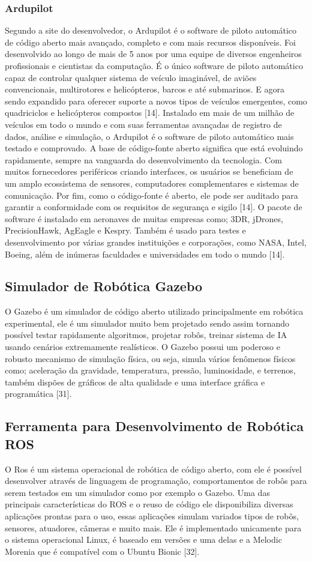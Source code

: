\subsubsection{Ardupilot}
Segundo a site do desenvolvedor, o Ardupilot é o software de piloto automático de código aberto mais avançado, completo e com mais recursos disponíveis. Foi desenvolvido ao longo de mais de 5 anos por uma equipe de diversos engenheiros profissionais e cientistas da computação. É o único software de piloto automático capaz de controlar qualquer sistema de veículo imaginável, de aviões convencionais, multirotores e helicópteros, barcos e até submarinos. E agora sendo expandido para oferecer suporte a novos tipos de veículos emergentes, como quadriciclos e helicópteros compostos [14].
Instalado em mais de um milhão de veículos em todo o mundo e com suas ferramentas avançadas de registro de dados, análise e simulação, o Ardupilot é o software de piloto automático mais testado e comprovado. A base de código-fonte aberto significa que está evoluindo rapidamente, sempre na vanguarda do desenvolvimento da tecnologia. Com muitos fornecedores periféricos criando interfaces, os usuários se beneficiam de um amplo ecossistema de sensores, computadores complementares e sistemas de comunicação. Por fim, como o código-fonte é aberto, ele pode ser auditado para garantir a conformidade com os requisitos de segurança e sigilo [14].
O pacote de software é instalado em aeronaves de muitas empresas como; 3DR, jDrones, PrecisionHawk, AgEagle e Kespry. Também é usado para testes e desenvolvimento por várias grandes instituições e corporações, como NASA, Intel, Boeing, além de inúmeras faculdades e universidades em todo o mundo [14].

\subsection{Simulador de Robótica Gazebo}
O Gazebo é um simulador de código aberto utilizado principalmente em robótica experimental, ele é um simulador muito bem projetado sendo assim tornando possível testar rapidamente algoritmos, projetar robôs, treinar sistema de IA usando cenários extremamente realísticos. O Gazebo possui um poderoso e robusto mecanismo de simulação física, ou seja, simula vários fenômenos físicos como; aceleração da gravidade, temperatura, pressão, luminosidade, e terrenos, também dispões de gráficos de alta qualidade e uma interface gráfica e programática [31]. 
\subsection{Ferramenta para Desenvolvimento de Robótica ROS}
O Ros é um sistema operacional de robótica de código aberto, com ele é possível desenvolver através de linguagem de programação, comportamentos de robôs para serem testados em um simulador como por exemplo o Gazebo. Uma das principais características do ROS e o reuso de código ele disponibiliza diversas aplicações prontas para o uso, essas aplicações simulam variados tipos de robôs, sensores, atuadores, câmeras e muito mais. Ele é implementado unicamente para o sistema operacional Linux, é baseado em versões e uma delas e a Melodic Morenia que é compatível com o Ubuntu Bionic [32].
